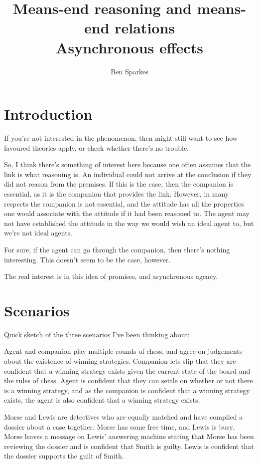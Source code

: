 \documentclass[10pt]{article}
\title{Means-end reasoning and means-end relations \\ Asynchronous effects}
\author{Ben Sparkes}
\begin{document}
\section{Introduction}
\label{sec:introduction}

If you're not interested in the phenomenon, then might still want to see how favoured theories apply, or check whether there's no trouble.


So, I think there's something of interest here because one often assumes that the link is what reasoning is.
An individual could not arrive at the conclusion if they did not reason from the premises.
If this is the case, then the companion is essential, as it is the companion that provides the link.
However, in many respects the companion is not essential, and the attitude has all the properties one would associate with the attitude if it had been reasoned to.
The agent may not have established the attitude in the way we would wish an ideal agent to, but we're not ideal agents.

For sure, if the agent can go through the companion, then there's nothing interesting.
This doesn't seem to be the case, however.

The real interest is in this idea of promises, and asynchronous agency.

\section{Scenarios}
\label{sec:scenarios}

Quick sketch of the three scenarios I've been thinking about:

\begin{scenario}[Chess]
  Agent and companion play multiple rounds of chess, and agree on judgements about the existence of winning strategies.
  Companion lets slip that they are confident that a winning strategy exists given the current state of the board and the rules of chess.
  Agent is confident that they can settle on whether or not there is a winning strategy, and as the companion is confident that a winning strategy exists, the agent is also confident that a winning strategy exists.
\end{scenario}

\begin{scenario}[Morse]
  Morse and Lewis are detectives who are equally matched and have complied a dossier about a case together.
  Morse has some free time, and Lewis is busy.
  Morse leaves a message on Lewis' answering machine stating that Morse has been reviewing the dossier and is confident that Smith is guilty.
  Lewis is confident that the dossier supports the guilt of Smith.
\end{scenario}
\end{document}
